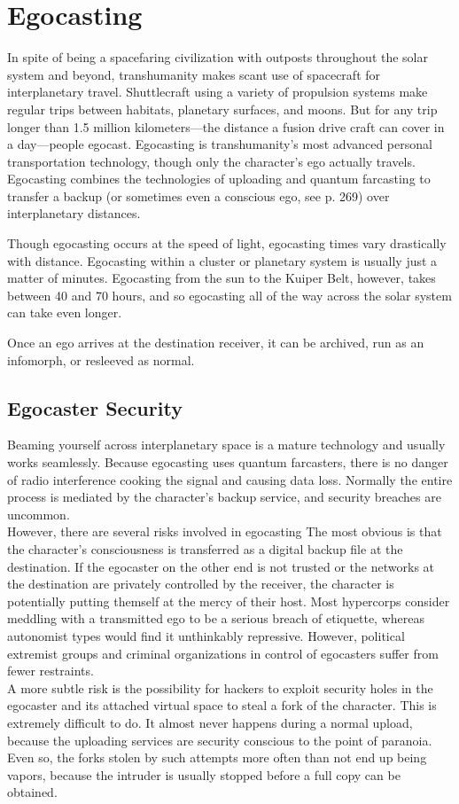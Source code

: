 \section{Egocasting}

In spite of being a spacefaring civilization with outposts
throughout the solar system and beyond, transhumanity
makes scant use of spacecraft for interplanetary
travel. Shuttlecraft using a variety of propulsion
systems make regular trips between habitats, planetary 
surfaces, and moons. But for any trip longer than 1.5 
million kilometers—the distance a fusion drive craft 
can cover in a day—people egocast.
Egocasting is transhumanity's most advanced 
personal transportation technology, though only the 
character's ego actually travels. Egocasting combines 
the technologies of uploading and quantum farcasting 
to transfer a backup (or sometimes even a conscious 
ego, see p. 269) over interplanetary distances.

Though egocasting occurs at the speed of light, 
egocasting times vary drastically with distance. Egocasting
within a cluster or planetary system is usually
just a matter of minutes. Egocasting from the sun to 
the Kuiper Belt, however, takes between 40 and 70 
hours, and so egocasting all of the way across the 
solar system can take even longer.

Once an ego arrives at the destination receiver, it can 
be archived, run as an infomorph, or resleeved as normal.

\subsection{Egocaster Security}

Beaming yourself across interplanetary space is a 
mature technology and usually works seamlessly. Because
egocasting uses quantum farcasters, there is no
danger of radio interference cooking the signal and 
causing data loss. Normally the entire process is mediated
by the character's backup service, and security
breaches are uncommon.
\\
However, there are several risks involved in egocasting
The most obvious is that the character's consciousness
is transferred as a digital backup file at the
destination. If the egocaster on the other end is not 
trusted or the networks at the destination are privately 
controlled by the receiver, the character is potentially 
putting themself at the mercy of their host. Most hypercorps
consider meddling with a transmitted ego to
be a serious breach of etiquette, whereas autonomist 
types would find it unthinkably repressive. However, 
political extremist groups and criminal organizations 
in control of egocasters suffer from fewer restraints.
\\
A more subtle risk is the possibility for hackers to 
exploit security holes in the egocaster and its attached 
virtual space to steal a fork of the character. This is 
extremely difficult to do. It almost never happens 
during a normal upload, because the uploading services
are security conscious to the point of paranoia.
Even so, the forks stolen by such attempts more often 
than not end up being vapors, because the intruder 
is usually stopped before a full copy can be obtained.

